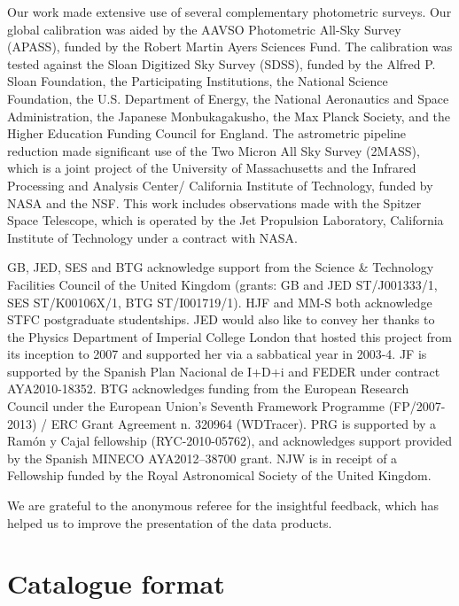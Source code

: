 \documentclass[a4paper,useAMS,usenatbib]{mn2e}
\begin{document}
Our work made extensive use of
several complementary photometric surveys.
Our global calibration was aided
by the AAVSO Photometric All-Sky Survey (APASS),
funded by the Robert Martin Ayers Sciences Fund.
The calibration was tested against the
Sloan Digitized Sky Survey (SDSS),
funded by the Alfred P. Sloan Foundation,
the Participating Institutions,
the National Science Foundation,
the U.S. Department of Energy,
the National Aeronautics and Space Administration,
the Japanese Monbukagakusho, the Max Planck Society,
and the Higher Education Funding Council for England.
The astrometric pipeline reduction made
significant use of the Two Micron All Sky Survey (2MASS),
which is a joint project 
of the University of Massachusetts
and the Infrared Processing and Analysis Center/
California Institute of Technology,
funded by NASA and the NSF.
This work includes observations made
with the Spitzer Space Telescope,
which is operated by the Jet Propulsion Laboratory,
California Institute of Technology under a contract with NASA. 

GB, JED, SES and BTG acknowledge support from the Science \& Technology
Facilities Council of the United Kingdom
(grants: GB and JED ST/J001333/1, SES ST/K00106X/1, BTG ST/I001719/1). 
HJF and MM-S both acknowledge STFC postgraduate studentships.
JED would also like to convey her thanks
to the Physics Department of Imperial College London
that hosted this project from its inception to 2007 and supported
her via a sabbatical year in 2003-4.
JF is supported by the Spanish Plan Nacional de I+D+i and FEDER under contract AYA2010-18352.
BTG acknowledges funding from the
European Research Council under the European Union's Seventh Framework
Programme (FP/2007-2013) / ERC Grant Agreement n. 320964 (WDTracer).
PRG is supported by a Ram\'on y Cajal fellowship (RYC-2010-05762), and acknowledges support provided by the Spanish MINECO AYA2012--38700 grant.
NJW is in receipt of a Fellowship funded by 
the Royal Astronomical Society of the United Kingdom.

We are grateful to the anonymous referee for the insightful feedback,
which has helped us to improve the presentation of the data products.

\label{lastpage}

\footnotesize{
  
  
}

\newpage
\appendix

\newpage
\onecolumn
\section{Catalogue format}
\label{app:columns}
\end{document}
